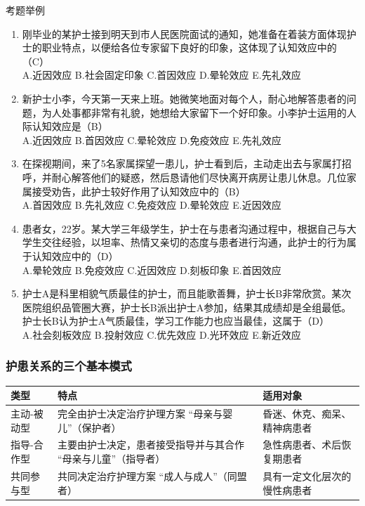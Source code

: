\documentclass[11pt, a4paper]{ctexart}
\begin{document}
\begin{examplebox}{考题举例}
\begin{enumerate}
    \item 刚毕业的某护士接到明天到市人民医院面试的通知，她准备在着装方面体现护士的职业特点，以便给各位专家留下良好的印象，这体现了认知效应中的（C）\\
    A.近因效应 \quad B.社会固定印象 \quad C.首因效应 \quad D.晕轮效应 \quad E.先礼效应
    \item 新护士小李，今天第一天来上班。她微笑地面对每个人，耐心地解答患者的问题，为人处事都非常有礼貌，她想给大家留下一个好印象。小李护士运用的人际认知效应是（B）\\
    A.近因效应 \quad B.首因效应 \quad C.晕轮效应 \quad D.免疫效应 \quad E.先礼效应
    \item 在探视期间，来了5名家属探望一患儿，护士看到后，主动走出去与家属打招呼，并耐心解答他们的疑惑，然后恳请他们尽快离开病房让患儿休息。几位家属接受劝告，此护士较好作用了认知效应中的（B）\\
    A.首因效应 \quad B.先礼效应 \quad C.免疫效应 \quad D.晕轮效应 \quad E.近因效应
    \item 患者女，22岁。某大学三年级学生，护士在与患者沟通过程中，根据自己与大学生交往经验，以坦率、热情又亲切的态度与患者进行沟通，此护士的行为属于认知效应中的（D）\\
    A.晕轮效应 \quad B.免疫效应 \quad C.近因效应 \quad D.刻板印象 \quad E.首因效应
    \item 护士A是科里相貌气质最佳的护士，而且能歌善舞，护士长B非常欣赏。某次医院组织品管圈大赛，护士长B派出护士A参加，结果其成绩却是全组最低。护士长B认为护士A气质最佳，学习工作能力也应当最佳，这属于（D）\\
    A.社会刻板效应 \quad B.投射效应 \quad C.优先效应 \quad D.光环效应 \quad E.新近效应
\end{enumerate}
\end{examplebox}

\subsubsection{护患关系的三个基本模式}
\begin{table}[htbp]
\centering
\renewcommand{\arraystretch}{1.4} %
\begin{tabularx}{\textwidth}{lXX}
\toprule
\textbf{类型} & \textbf{特点} & \textbf{适用对象} \\
\midrule
主动-被动型 & 完全由护士决定治疗护理方案 “母亲与婴儿”（保护者） & 昏迷、休克、痴呆、精神病患者 \\
\addlinespace %
指导-合作型 & 主要由护士决定，患者接受指导并与其合作 “母亲与儿童”（指导者） & 急性病患者、术后恢复期患者 \\
\addlinespace
共同参与型 & 共同决定治疗护理方案 “成人与成人”（同盟者） & 具有一定文化层次的慢性病患者 \\
\bottomrule
\end{tabularx}
\end{table}
\end{document}
